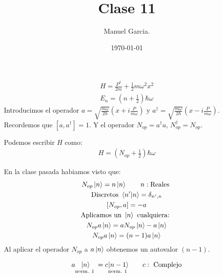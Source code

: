 \documentclass{article}
\title{Clase 11 }
\author{Manuel Garcia.}
\date{\today}
\newcommand{\caja}[3]{%
  \begin{tcolorbox}[colback=#1!5!white,colframe=#1!25!black,title=#2]
    #3
  \end{tcolorbox}%
}
\begin{document}
\maketitle

\section{}
\begin{gather*}
  H = \frac{P^2 }{2m } + \frac{1}{2} m \omega^2 x^2 \\
  E_n = (n + \frac{1}{2}) \hbar  \omega
\end{gather*}
Introducimos el operador $ a = \sqrt{\frac{m \omega}{2 \hbar }} (x + i \frac{P }{m\omega} ) $ y $ a ^ {\dag } = \sqrt{\frac{m \omega}{2 \hbar }} \left(x - i\frac{P }{m\omega}\right) $. Recordemos que $ [a,a ^ {\dag }] = 1  $. Y el operador $ N _{op } = a ^ {\dag }a  $, $ N _{op } ^ {\dag } = N _{op }  $. 

Podemos escribir $ H  $ como: 
\begin{gather*}
  H = (N _{op }  + \frac{1}{2}) \hbar \omega
\end{gather*}

En la clase pasada habiamos visto que: 
\begin{gather*}
  N _{op } \ket{n } = n \ket{n } \qquad n:\text{Reales }\\
  \text{Discretos } \bra{n' }\ket{n } = \delta _{n', n } \\
  [N _{op } , a ] = - a \\
  \text{Aplicamos un }\ket{n }\text{ cualquiera: }\\
  N _{op } a \ket{n } = a N _{op } \ket{n } - a \ket{n }\\
  N _{op } a \ket{n } = (n -1 ) a \ket{n }
\end{gather*}
Al aplicar el operador $ N _{op }  $ a $ a \ket{n } $ obtenemos un autovalor $ (n-1) $.

\caja{black}{nota }{
  \begin{gather*}
    a \underset{\text{norm. 1 }}{\ket{n }} = c \underset{\text{norm. 1 }}{\ket{n-1 }} \qquad c: \text{ Complejo}
  \end{gather*}
}
\end{document}
